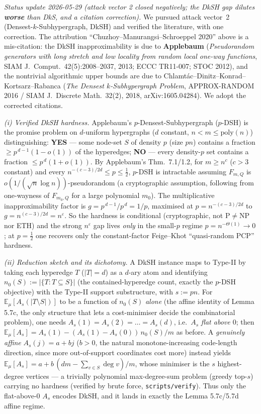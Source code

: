 \documentclass[
]{article}
\begin{document}
\emph{Status update 2026-05-29 (attack vector 2 closed negatively;
the DkSH gap dilutes \textbf{worse} than DkS, and a citation correction).}
We pursued attack vector~2 (Densest-$k$-Subhypergraph, DkSH) and
verified the literature, with one correction. The attribution
``Chuzhoy--Manurangsi--Schroeppel 2020'' above is a mis-citation: the
DkSH inapproximability is due to \textbf{Applebaum} (\emph{Pseudorandom
generators with long stretch and low locality from random local one-way
functions}, SIAM J.\ Comput.\ 42(5):2008--2037, 2013; ECCC TR11-007;
STOC 2012), and the nontrivial algorithmic upper bounds are due to
Chlamt\'ac--Dinitz--Konrad--Kortsarz--Rabanca (\emph{The Densest
$k$-Subhypergraph Problem}, APPROX-RANDOM 2016 / SIAM J.\ Discrete
Math.\ 32(2), 2018, arXiv:1605.04284). We adopt the corrected citations.

\emph{(i) Verified DkSH hardness.} Applebaum's $p$-Densest-Subhypergraph
($p$-DSH) is the promise problem on $d$-uniform hypergraphs ($d$ constant,
$n<m\le\mathrm{poly}(n)$) distinguishing: \textbf{YES} --- some node-set
$S$ of density $p$ (size $pn$) contains a fraction
$\ge p^{\,d-1}(1-o(1))$ of the hyperedges; \textbf{NO} --- every density-$p$
set contains a fraction $\le p^{\,d}(1+o(1))$. By Applebaum's
Thm.\ 7.1/1.2, for $m\ge n^{c}$ ($c>3$ constant) and every
$n^{-(c-3)/2d}\le p\le \tfrac12$, $p$-DSH is intractable assuming
$F_{m,Q}$ is $o(1/(\sqrt n\log n))$-pseudorandom (a cryptographic
assumption, following from one-wayness of $F_{m_0,Q}$ for a large
polynomial $m_0$). The multiplicative inapproximability factor is
$g=p^{\,d-1}/p^{\,d}=1/p$, maximised at $p=n^{-(c-3)/2d}$ to
$g=n^{(c-3)/2d}=n^{\varepsilon}$. So the hardness is conditional
(cryptographic, not $\mathrm P\neq\mathrm{NP}$ nor ETH) and the strong
$n^{\varepsilon}$ gap lives \emph{only} in the small-$p$ regime
$p=n^{-\Theta(1)}\to 0$; at $p=\tfrac12$ one recovers only the
constant-factor Feige--Khot ``quasi-random PCP'' hardness.

\emph{(ii) Reduction sketch and its dichotomy.} A DkSH instance maps to
Type-II by taking each hyperedge $T$ ($|T|=d$) as a $d$-ary atom and
identifying $n_0(S):=|\{T:T\subseteq S\}|$ (the contained-hyperedge
count, exactly the $p$-DSH objective) with the Type-II support
substructure, with $s:=pn$. For $\mathbb E_\mu[A_s(|T\setminus S|)]$ to
be a function of $n_0(S)$ \emph{alone} (the affine identity of
Lemma 5.7c, the only structure that lets a cost-minimiser decide the
combinatorial problem), one needs $A_s(1)=A_s(2)=\dots=A_s(d)$, i.e.\
$A_s$ \emph{flat above $0$}; then
$\mathbb E_\mu[A_s]=A_s(1)-(A_s(1)-A_s(0))\,n_0(S)/m$ as before. A
\emph{genuinely affine} $A_s(j)=a+bj$ ($b>0$, the natural
monotone-increasing code-length direction, since more out-of-support
coordinates cost more) instead yields
$\mathbb E_\mu[A_s]=a+b\,(dm-\sum_{v\in S}\deg v)/m$, whose minimiser is
the $s$ highest-degree vertices --- a trivially polynomial
max-degree-sum problem (greedy top-$s$) carrying no hardness (verified
by brute force, \texttt{scripts/verify}). Thus only the flat-above-$0$
$A_s$ encodes DkSH, and it lands in exactly the Lemma 5.7c/5.7d affine
regime.
\end{document}
